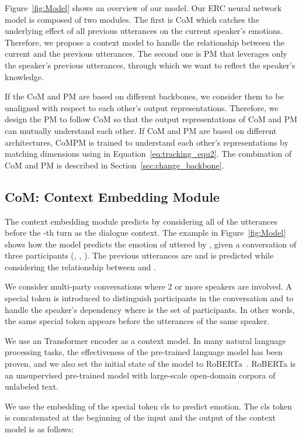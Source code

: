 \documentclass[11pt]{article}
\begin{document}
Figure~\ref{fig:Model} shows an overview of our model. Our ERC neural network model is composed of two modules. The first is CoM which catches the underlying effect of all previous utterances on the current speaker's emotions. Therefore, we propose a context model to handle the relationship between the current and the previous utterances. The second one is PM that leverages only the speaker's previous utterances, through which we want to reflect the speaker's knowledge.


If the CoM and PM are based on different backbones, we consider them to be unaligned with respect to each other's output representations. Therefore, we design the PM to follow CoM so that the output representations of CoM and PM can mutually understand each other. If CoM and PM are based on different architectures, CoMPM is trained to understand each other's representations by matching dimensions using  in Equation~\ref{eq:tracking_equ2}. The combination of CoM and PM is described in Section~\ref{sec:change_backbone}.


\subsection{CoM: Context Embedding Module}
The context embedding module predicts  by considering all of the utterances before the -th turn as the dialogue context. The example in Figure~\ref{fig:Model} shows how the model predicts the emotion of  uttered by , given a conversation of three participants (, , ). The previous utterances are  and  is predicted while considering the relationship between  and .


We consider multi-party conversations where 2 or more speakers are involved. A special token  is introduced to distinguish participants in the conversation and to handle the speaker's dependency where  is the set of participants. In other words, the same special token appears before the utterances of the same speaker.


We use an Transformer encoder as a context model. In many natural language processing tasks, the effectiveness of the pre-trained language model has been proven, and we also set the initial state of the model to RoBERTa~\cite{liu2019roberta}. RoBERTa is an unsupervised pre-trained model with large-scale open-domain corpora of unlabeled text. 


We use the embedding of the special token cls to predict emotion. The cls token is concatenated at the beginning of the input and the output of the context model is as follows:
\end{document}
